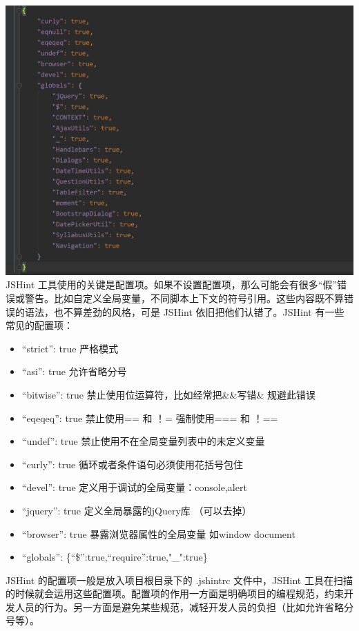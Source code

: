 \documentclass[hyperref, a4paper]{ctexart}
\providecommand{\tightlist}{%
  \setlength{\itemsep}{0pt}\setlength{\parskip}{0pt}}
\begin{document}
\includegraphics{screenshots/jshintrc.png} JSHint
工具使用的关键是配置项。如果不设置配置项，那么可能会有很多``假''错误或警告。比如自定义全局变量，不同脚本上下文的符号引用。这些内容既不算错误的语法，也不算差劲的风格，可是
JSHint 依旧把他们认错了。JSHint 有一些常见的配置项：

\begin{itemize}
\tightlist
\item
  ``strict'': true 严格模式
\item
  ``asi'': true 允许省略分号
\item
  ``bitwise'': true 禁止使用位运算符，比如经常把\&\&写错\& 规避此错误
\item
  ``eqeqeq'': true 禁止使用== 和 ！= 强制使用=== 和 ！==
\item
  ``undef'': true 禁止使用不在全局变量列表中的未定义变量
\item
  ``curly'': true 循环或者条件语句必须使用花括号包住
\item
  ``devel'': true 定义用于调试的全局变量：console,alert
\item
  ``jquery'': true 定义全局暴露的jQuery库 （可以去掉）
\item
  ``browser'': true 暴露浏览器属性的全局变量 如window document
\item
  ``globals'': \{``\$'':true,``require'':true,"\_":true\}
\end{itemize}

JSHint 的配置项一般是放入项目根目录下的 .jshintrc 文件中，JSHint
工具在扫描的时候就会运用这些配置项。配置项的作用一方面是明确项目的编程规范，约束开发人员的行为。另一方面是避免某些规范，减轻开发人员的负担（比如允许省略分号等）。
\end{document}
